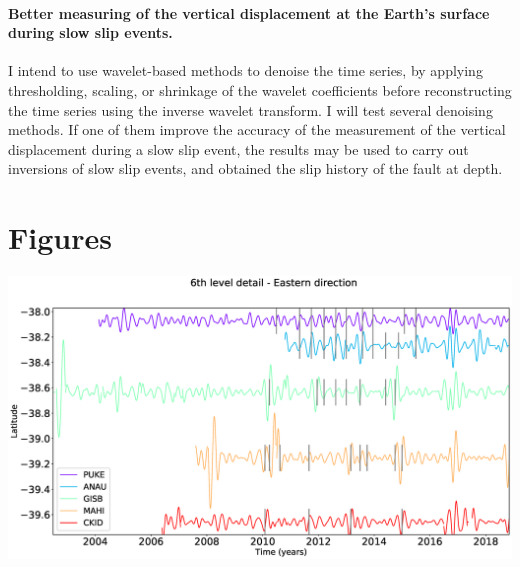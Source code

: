 \documentclass[letterpaper, 12pt]{article}
\begin{document}
\paragraph{Better measuring of the vertical displacement at the Earth's surface during slow slip events.}  I intend to use wavelet-based methods to denoise the time series, by applying thresholding, scaling, or shrinkage of the wavelet coefficients before reconstructing the time series using the inverse wavelet transform. I will test several denoising methods. If one of them improve the accuracy of the measurement of the vertical displacement during a slow slip event, the results may be used to carry out inversions of slow slip events, and obtained the slip history of the fault at depth. 

\newpage
\setcounter{page}{1}




\newpage
\setcounter{page}{1}

\section*{Figures}

\begin{center}
\includegraphics[trim={2.5cm 0.5cm 5cm 0.5cm}, clip, width=400pt]{figures/slowslip_MRA.eps}
\captionsetup{type=figure}
\end{center}
\end{document}
